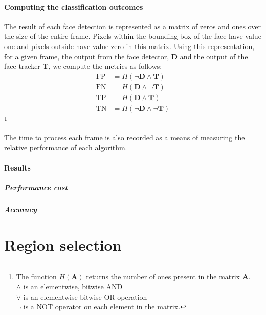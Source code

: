 \paragraph{Computing the classification outcomes} The result of each face detection is represented as a matrix of zeros and ones over the size of the entire frame.
Pixels within the bounding box of the face have value one and pixels outside have value zero in this matrix. Using this representation, for a given frame, the output from the face detector, $\mathbf{D}$ and the output of the face tracker $\mathbf{T}$, we compute the metrics as follows: 
\begin{align*}
    \mathrm{FP} &= H(\neg{\mathbf{D}} \wedge \mathbf{T}) \\
    \mathrm{FN} &= H(\mathbf{D} \wedge \neg{\mathbf{T}})\\
    \mathrm{TP} &= H(\mathbf{D} \wedge \mathbf{T})\\
    \mathrm{TN} &= H(\neg{\mathbf{D}} \wedge \neg{\mathbf{T}})
\end{align*}
\footnote{The function $H(\mathbf{A})$ returns the number of ones present in the matrix $\mathbf{A}$.\\$\wedge$ is an elementwise, bitwise AND \\ $\vee$ is an elementwise bitwise OR operation \\ $\neg$ is a NOT operator on each element in the matrix.}
\\\\
The time to process each frame is also recorded as a means of measuring the relative performance of each algorithm.
\paragraph{Results}
\subparagraph{Performance cost}
\subparagraph{Accuracy}


\section{Region selection}
\label{section:region_selection}
